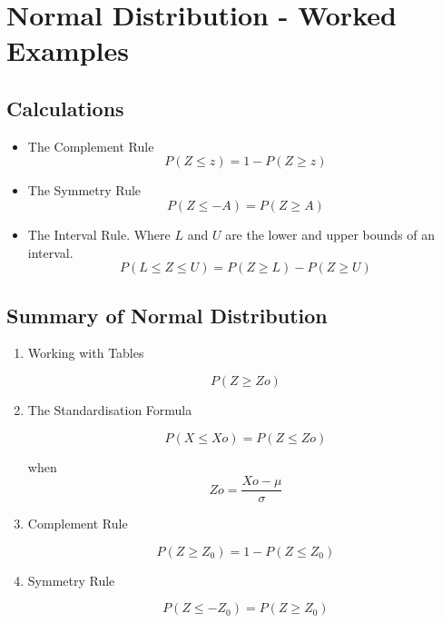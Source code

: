 
\chapter{Normal Distribution - Worked Examples}
\section{Calculations}

\begin{framed}
	\begin{itemize}
		\item The Complement Rule
		\begin{equation}
		P(Z \leq z) = 1 - P(Z \geq z)
		\end{equation}
		\item The Symmetry Rule
		\begin{equation}
		P(Z \leq -A) = P(Z \geq A)
		\end{equation}
		\item The Interval Rule.
		Where $L$ and $U$ are the lower and upper bounds of an interval.
		\begin{equation}
		P(L \leq Z \leq U) = P(Z \geq L) -  P(Z \geq U)
		\end{equation}
		
	\end{itemize}
\end{framed}

\section{Summary of Normal Distribution}

\begin{enumerate}
	\item Working with Tables
	
	\[P(Z \geq Zo)\]
	
	\item The Standardisation Formula
	
	\[P(X \leq Xo) = P(Z \leq Zo)	  \]  
	
	when   \[Zo=\frac{Xo- \mu}{\sigma}\]
	
	\item Complement Rule
	
	\[P(Z\geq Z_0) = 1 - P(Z \leq Z_0)\]
	
	\item  Symmetry Rule
	
	
	\[P(Z \leq -Z_0) = P(Z \geq Z_0)\]
	
\end{enumerate}


